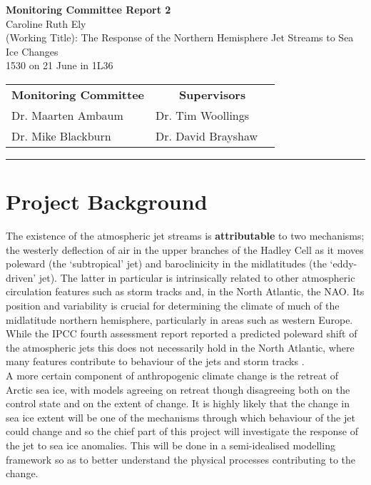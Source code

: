 \documentclass [11pt,a4paper,twosided] {report}
\begin{document}
	\begin{center}
		\Large{\textbf{Monitoring Committee Report 2}}\\[0.15cm]
		\large{Caroline Ruth Ely}\\
                \large{(Working Title): The Response of the Northern Hemisphere Jet Streams to Sea Ice Changes}\\
		\normalsize{1530 on 21 June  in 1L36}\\[0.15cm]		
		\begin{tabular}{lll}
			\multicolumn{1}{l}{\textbf{Monitoring Committee}}	&	\multicolumn{2}{c}{ \textbf{Supervisors}}	\\
			Dr. Maarten Ambaum		&	Dr. Tim Woollings	& \\
			Dr. Mike Blackburn			&	Dr. David Brayshaw	\\
		\end{tabular}
	\end{center}
	\rule{\textwidth}{0.2mm}

\section*{Project Background}
The existence of the atmospheric jet streams is {\bf attributable} to two mechanisms; the westerly deflection of air in the upper branches of the Hadley Cell as it moves poleward (the `subtropical' jet) and baroclinicity in the midlatitudes (the `eddy-driven' jet). The latter in particular is intrinsically related to other atmospheric circulation features such as storm tracks and, in the North Atlantic, the NAO. Its position and variability is crucial for determining the climate of much of the midlatitude northern hemisphere, particularly in areas such as western Europe. While the IPCC fourth assessment report reported a predicted poleward shift of the atmospheric jets \citep{AR4WG1} this does not necessarily hold in the North Atlantic, where many features contribute to behaviour of the jets and storm tracks \citep[e.g.][]{Brayshaw_tracks1, Brayshaw_tracks2}.\\
A more certain component of anthropogenic climate change is the retreat of Arctic sea ice, with models agreeing on retreat though disagreeing both on the control state and on the extent of change. It is highly likely that the change in sea ice extent will be one of the mechanisms through which behaviour of the jet could change and so the chief part of this project will investigate the response of the jet to sea ice anomalies. This will be done in a semi-idealised modelling framework so as to better understand the physical processes contributing to the change.
\end{document}
